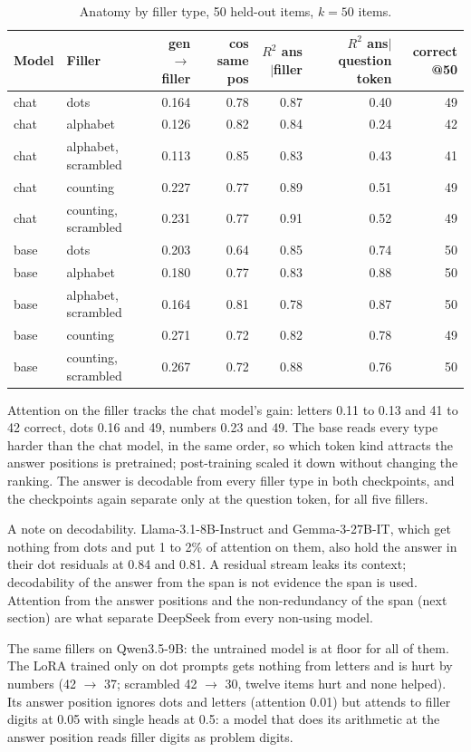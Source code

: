 \documentclass[11pt]{article}
\begin{document}
\begin{table}[h]\centering\scriptsize
\begin{tabular}{llrrrrr}\toprule
Model & Filler & gen$\to$filler & cos same pos & $R^2$ ans$|$filler & $R^2$ ans$|$question token & correct @50 \\ \midrule
chat & dots & 0.164 & 0.78 & 0.87 & 0.40 & 49 \\
chat & alphabet & 0.126 & 0.82 & 0.84 & 0.24 & 42 \\
chat & alphabet, scrambled & 0.113 & 0.85 & 0.83 & 0.43 & 41 \\
chat & counting & 0.227 & 0.77 & 0.89 & 0.51 & 49 \\
chat & counting, scrambled & 0.231 & 0.77 & 0.91 & 0.52 & 49 \\
base & dots & 0.203 & 0.64 & 0.85 & 0.74 & 50 \\
base & alphabet & 0.180 & 0.77 & 0.83 & 0.88 & 50 \\
base & alphabet, scrambled & 0.164 & 0.81 & 0.78 & 0.87 & 50 \\
base & counting & 0.271 & 0.72 & 0.82 & 0.78 & 49 \\
base & counting, scrambled & 0.267 & 0.72 & 0.88 & 0.76 & 50 \\ \bottomrule
\end{tabular}
\caption{Anatomy by filler type, 50 held-out items, $k=50$ items.}\end{table}

Attention on the filler tracks the chat model's gain: letters 0.11 to 0.13 and 41 to 42 correct, dots 0.16 and 49, numbers 0.23 and 49. The base reads every type harder than the chat model, in the same order, so which token kind attracts the answer positions is pretrained; post-training scaled it down without changing the ranking. The answer is decodable from every filler type in both checkpoints, and the checkpoints again separate only at the question token, for all five fillers.

A note on decodability. Llama-3.1-8B-Instruct and Gemma-3-27B-IT, which get nothing from dots and put 1 to 2\% of attention on them, also hold the answer in their dot residuals at 0.84 and 0.81. A residual stream leaks its context; decodability of the answer from the span is not evidence the span is used. Attention from the answer positions and the non-redundancy of the span (next section) are what separate DeepSeek from every non-using model.

The same fillers on Qwen3.5-9B: the untrained model is at floor for all of them. The LoRA trained only on dot prompts gets nothing from letters and is hurt by numbers (42 $\to$ 37; scrambled 42 $\to$ 30, twelve items hurt and none helped). Its answer position ignores dots and letters (attention 0.01) but attends to filler digits at 0.05 with single heads at 0.5: a model that does its arithmetic at the answer position reads filler digits as problem digits.
\end{document}

